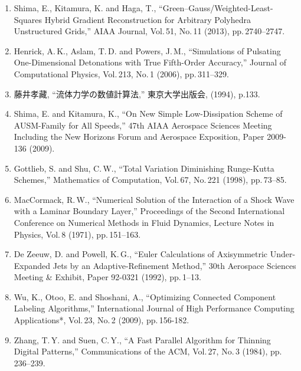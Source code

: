 \documentclass[a4j]{jarticle}
\begin{document}
\begin{enumerate}
  \item Shima, E., Kitamura, K. and Haga, T., ``Green–Gauss/Weighted-Least-Squares Hybrid Gradient Reconstruction for Arbitrary Polyhedra Unstructured Grids,'' 
  AIAA Journal, Vol.\,51, No.\,11 (2013), pp.\,2740--2747.
  \label{ref:gg}

  \item Henrick, A.\,K., Aslam, T.\,D. and Powers, J.\,M., ``Simulations of Pulsating One-Dimensional Detonations with True Fifth-Order Accuracy,'' 
  Journal of Computational Physics, Vol.\,213, No.\,1 (2006), pp.\,311--329.
  \label{ref:MUSCL}

  \item 藤井孝藏, ``流体力学の数値計算法,'' 東京大学出版会, (1994), p.133.
  \label{ref:fuji}

  \item Shima, E. and Kitamura, K., ``On New Simple Low-Dissipation Scheme of AUSM-Family for All Speeds,'' 
  47th AIAA Aerospace Sciences Meeting Including the New Horizons Forum and Aerospace Exposition, Paper 2009-136 (2009).
  \label{ref:SLAU}

  \item Gottlieb, S. and Shu, C.\,W., ``Total Variation Diminishing Runge-Kutta Schemes,'' 
  Mathematics of Computation, Vol.\,67, No.\,221 (1998), pp.\,73–85.  
  \label{ref:TVDrk3}

  \item MacCormack, R.\,W., ``Numerical Solution of the Interaction of a Shock Wave with a Laminar Boundary Layer,'' 
  Proceedings of the Second International Conference on Numerical Methods in Fluid Dynamics, Lecture Notes in Physics, Vol.\,8 (1971), pp.\,151–163.  
  \label{ref:CFL}

  \item De Zeeuw, D. and Powell, K.\,G., ``Euler Calculations of Axisymmetric Under-Expanded Jets by an Adaptive-Refinement Method,'' 
  30th Aerospace Sciences Meeting \& Exhibit, Paper 92-0321 (1992), pp.\,1--13.
  \label{ref:AMR}

  \item Wu, K., Otoo, E. and Shoshani, A., ``Optimizing Connected Component Labeling Algorithms,'' 
  International Journal of High Performance Computing Applications*, Vol.\,23, No.\,2 (2009), pp.\,156-182.  
  \label{ref:CCL}

  \item Zhang, T.\,Y. and Suen, C.\,Y., ``A Fast Parallel Algorithm for Thinning Digital Patterns,'' 
  Communications of the ACM, Vol.\,27, No.\,3 (1984), pp.\,236--239.
  \label{ref:skelton}


\end{enumerate}
\end{document}
